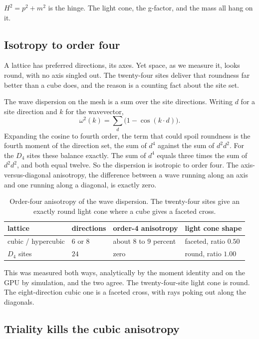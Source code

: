\begin{principle}
$H^2 = p^2 + m^2$ is the hinge. The light cone, the g-factor, and the mass all hang on it.
\end{principle}

\subsection{Isotropy to order four}

A lattice has preferred directions, its axes. Yet space, as we measure it, looks round, with no axis singled out.
The twenty-four sites deliver that roundness far better than a cube does, and the reason is a counting fact about
the site set.

The wave dispersion on the mesh is a sum over the site directions. Writing $d$ for a site direction and $k$ for the
wavevector,
\[
\omega^2(k) = \sum_{d} \bigl( 1 - \cos(k \cdot d) \bigr).
\]
Expanding the cosine to fourth order, the term that could spoil roundness is the fourth moment of the direction set,
the sum of $d^4$ against the sum of $d^2 d^2$. For the $D_4$ sites these balance exactly. The sum of $d^4$ equals
three times the sum of $d^2 d^2$, and both equal twelve. So the dispersion is isotropic to order four. The
axis-versus-diagonal anisotropy, the difference between a wave running along an axis and one running along a
diagonal, is exactly zero.

\begin{table}[ht]
\centering
\begin{tabular}{@{}llll@{}}
\toprule
lattice & directions & order-4 anisotropy & light cone shape \\
\midrule
cubic / hypercubic & $6$ or $8$ & about $8$ to $9$ percent & faceted, ratio $0.50$ \\
$D_4$ sites & $24$ & zero & round, ratio $1.00$ \\
\bottomrule
\end{tabular}
\caption{Order-four anisotropy of the wave dispersion. The twenty-four sites give an exactly round light cone where
a cube gives a faceted cross.}
\label{tab:isotropy}
\end{table}

This was measured both ways, analytically by the moment identity and on the GPU by simulation, and the two agree.
The twenty-four-site light cone is round. The eight-direction cubic one is a faceted cross, with rays poking out
along the diagonals.

\subsection{Triality kills the cubic anisotropy}

